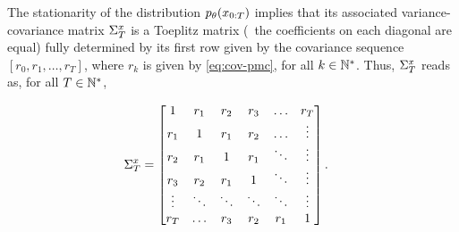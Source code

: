 \begin{remark}
    The stationarity of the distribution $p_{\theta}(x_{0:T})$ 
    implies that
    its associated variance-covariance matrix $\Sigma^{x}_{T}$  is a Toeplitz matrix
    (\ie~the coefficients on each diagonal are equal) 
    fully determined by its first row given by the covariance  sequence
    $[r_0, r_1, \ldots,r_T]$, where $r_k$ is given by \eqref{eq:cov-pmc}, 
    for all $k \in \mathbb{N}^*$.
    Thus, $\Sigma^{x}_{T}$   
    reads as,  for all $T \in \mathbb{N}^*$,

        \begin{align*}
            & \Sigma^{x}_{T}
            \displaystyle  
            =
         \begin{bmatrix}
        1 & r_1 & r_2 & r_3 & \dots & r_T \\
        r_1 & 1 & r_1 & r_2 & \dots &\vdots \\
        r_2 & r_1 &  1 & r_1 &\ddots & \vdots\\
        r_3 & r_2&  r_1 & 1 &\ddots & \vdots\\
        \vdots &\ddots &  \ddots &\ddots &\ddots & \vdots\\
        r_T & \dots & r_3 & r_2 & r_1 & 1  
        \end{bmatrix}
        \text{.}
        \end{align*}
\end{remark}

